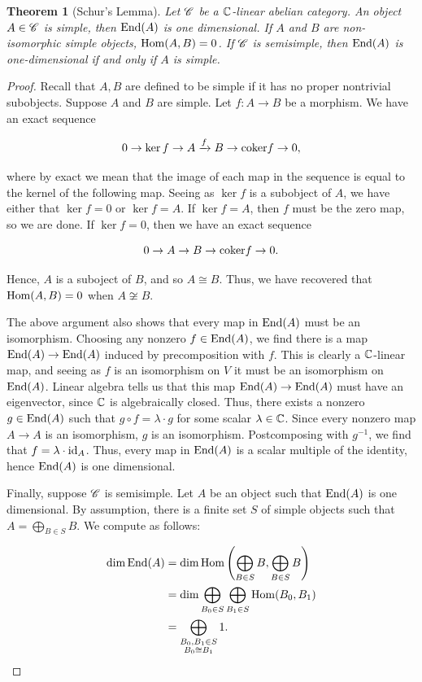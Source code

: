 \documentclass{article}
\newtheorem{theorem}{Theorem}[section]
\theoremstyle{definition}
\numberwithin{figure}{section}
\begin{document}
\begin{theorem}[Schur's Lemma]\label{Schurs Lemma} Let $\mathscr{C}$ be a $\mathbb{C}$-linear abelian category. An object $A\in \mathscr{C}$ is simple, then $\mathrm{End}(A)$ is one dimensional. If $A$ and $B$ are non-isomorphic simple objects, $\mathrm{Hom}(A,B)=0$. If $\mathscr{C}$ is semisimple, then $\mathrm{End}(A)$ is one-dimensional if and only if $A$ is simple.
\end{theorem}
\begin{proof} Recall that $A,B$ are defined to be simple if it has no proper nontrivial subobjects. Suppose $A$ and $B$ are simple. Let $f:A\to B$ be a morphism. We have an exact sequence

$$0\to \ker f \to A\xrightarrow{f} B\to \mathrm{coker} f\to 0,$$

where by exact we mean that the image of each map in the sequence is equal to the kernel of the following map. Seeing as $\ker f$ is a subobject of $A$, we have either that $\ker f= 0$ or $\ker f = A$. If $\ker f = A$, then $f$ must be the zero map, so we are done. If $\ker f =0$, then we have an exact sequence

$$0\to A\to B\to \mathrm{coker} f\to 0.$$

Hence, $A$ is a suboject of $B$, and so $A\cong B$. Thus, we have recovered that $\mathrm{Hom}(A,B)=0$ when $A\not\cong B$.

The above argument also shows that every map in $\mathrm{End}(A)$ must be an isomorphism. Choosing any nonzero $f\in \mathrm{End}(A)$, we find there is a map $\mathrm{End}(A)\to \mathrm{End}(A)$ induced by precomposition with $f$. This is clearly a $\mathbb{C}$-linear map, and seeing as $f$ is an isomorphism on $V$ it must be an isomorphism on $\mathrm{End}(A)$. Linear algebra tells us that this map $\mathrm{End}(A)\to \mathrm{End}(A)$ must have an eigenvector, since $\mathbb{C}$ is algebraically closed. Thus, there exists a nonzero $g\in \mathrm{End}(A)$ such that $g\circ f=\lambda \cdot g$ for some scalar $\lambda\in \mathbb{C}$. Since every nonzero map $A\to A$ is an isomorphism, $g$ is an isomorphism. Postcomposing with $g^{-1}$, we find that $f=\lambda \cdot\mathrm{id}_A$. Thus, every map in $\mathrm{End}(A)$ is a scalar multiple of the identity, hence $\mathrm{End}(A)$ is one dimensional.

Finally, suppose $\mathscr{C}$ is semisimple. Let $A$ be an object such that $\mathrm{End}(A)$ is one dimensional. By assumption, there is a finite set $S$ of simple objects such that $A=\bigoplus_{B\in S}B$. We compute as follows:

\begin{align*}
\dim \mathrm{End}(A)&=\dim \mathrm{Hom}\left(\bigoplus_{B\in S}B,\bigoplus_{B\in S} B\right)\\
&=\dim \bigoplus_{B_0 \in S}\bigoplus_{B_1\in S}\mathrm{Hom}(B_0,B_1)\\
&=\bigoplus_{\substack{B_0,B_1\in S \\ B_0\cong B_1}}1.
\end{align*}


\end{proof}
\end{document}

